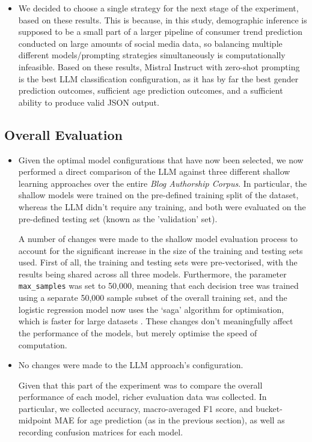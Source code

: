\documentclass{report}
\begin{document}
\begin{itemize}
\item We decided to choose a single strategy for the next stage of the experiment, based on these results. This is because, in this study, demographic inference is supposed to be a small part of a larger pipeline of consumer trend prediction conducted on large amounts of social media data, so balancing multiple different models/prompting strategies simultaneously is computationally infeasible. Based on these results, Mistral Instruct with zero-shot prompting is the best LLM classification configuration, as it has by far the best gender prediction outcomes, sufficient age prediction outcomes, and a sufficient ability to produce valid JSON output.
\end{itemize}

\subsection{Overall Evaluation}

\begin{itemize}
\item Given the optimal model configurations that have now been selected, we now performed a direct comparison of the LLM against three different shallow learning approaches over the entire \textit{Blog Authorship Corpus}. In particular, the shallow models were trained on the pre-defined training split of the dataset, whereas the LLM didn't require any training, and both were evaluated on the pre-defined testing set (known as the 'validation' set).

A number of changes were made to the shallow model evaluation process to account for the significant increase in the size of the training and testing sets used. First of all, the training and testing sets were pre-vectorised, with the results being shared across all three models. Furthermore, the parameter \texttt{max\_samples} was set to 50,000, meaning that each decision tree was trained using a separate 50,000 sample subset of the overall training set, and the logistic regression model now uses the `saga' algorithm for optimisation, which is faster for large datasets . These changes don't meaningfully affect the performance of the models, but merely optimise the speed of computation.

\item No changes were made to the LLM approach's configuration.

Given that this part of the experiment was to compare the overall performance of each model, richer evaluation data was collected. In particular, we collected accuracy, macro-averaged F1 score, and bucket-midpoint MAE for age prediction (as in the previous section), as well as recording confusion matrices for each model. 
\end{itemize}
\end{document}
